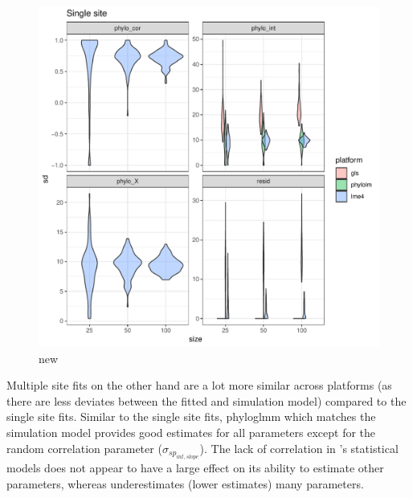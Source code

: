 \begin{center}
\begin{figure}[h]
  \includegraphics[scale=0.8,page=7]{./git_push/plot.Rout.pdf}
  \caption{new}
\end{figure}
\end{center}


Multiple site fits on the other hand are a lot more similar across platforms (as there are less deviates between the fitted and simulation model) compared to the single site fits.
Similar to the single site fits, phyloglmm which matches the simulation model provides good estimates for all parameters except for the random correlation parameter ($\sigma_{sp_{int,slope}}$).
The lack of correlation in 's statistical models does not appear to have a large effect on its ability to estimate other parameters, whereas  underestimates (lower estimates) many parameters.  

